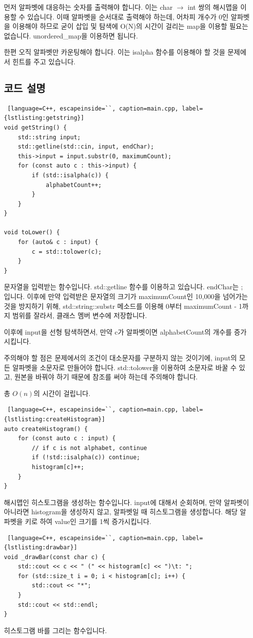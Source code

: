 \documentclass{article}
\begin{document}
먼저 알파벳에 대응하는 숫자를 출력해야 합니다. 이는 char $\rightarrow$ int 쌍의 해시맵을 이용할 수 있습니다. 이때 알파벳을 순서대로 출력해야 하는데, 어차피 개수가 0인 알파벳을 이용해야 하므로 굳이 삽입 및 탐색에 O(N)의 시간이 걸리는 map을 이용할 필요는 없습니다. unordered\_map을 이용하면 됩니다.

한편 오직 알파벳만 카운팅해야 합니다. 이는 isalpha 함수를 이용해야 할 것을 문제에서 힌트를 주고 있습니다.

\subsection{코드 설명}
\begin{lstlisting} [language=C++, escapeinside=``, caption=main.cpp, label={lstlisting:getstring}]
void getString() {
    std::string input;
    std::getline(std::cin, input, endChar);
    this->input = input.substr(0, maximumCount);
    for (const auto c : this->input) {
        if (std::isalpha(c)) {
            alphabetCount++;
        }
    }
}

void toLower() {
    for (auto& c : input) {
        c = std::tolower(c);
    }
}
\end{lstlisting}

문자열을 입력받는 함수입니다. std::getline 함수를 이용하고 있습니다. endChar는 ; 입니다. 이후에 만약 입력받은 문자열의 크기가 maximumCount인 10,000을 넘어가는 것을 방지하기 위해, std::string::substr 메소드를 이용해 0부터 maximumCount - 1까지 범위를 잘라서, 클래스 멤버 변수에 저장합니다.

이후에 input을 선형 탐색하면서, 만약 c가 알파벳이면 alphabetCount의 개수를 증가시킵니다.

주의해야 할 점은 문제에서의 조건이 대소문자를 구분하지 않는 것이기에, input의 모든 알파벳을 소문자로 만들어야 합니다. std::tolower을 이용하여 소문자로 바꿀 수 있고, 원본을 바꿔야 하기 때문에 참조를 써야 하는데 주의해야 합니다.

총 $O(n)$의 시간이 걸립니다.

\begin{lstlisting} [language=C++, escapeinside=``, caption=main.cpp, label={lstlisting:createHistogram}]
auto createHistogram() {
    for (const auto c : input) {
        // if c is not alphabet, continue
        if (!std::isalpha(c)) continue;
        histogram[c]++;
    }
}
\end{lstlisting}
해시맵인 히스토그램을 생성하는 함수입니다. input에 대해서 순회하며, 만약 알파벳이 아니라면 histogram을 생성하지 않고, 알파벳일 때 히스토그램을 생성합니다. 해당 알파벳을 키로 하여 value인 크기를 1씩 증가시킵니다.

\begin{lstlisting} [language=C++, escapeinside=``, caption=main.cpp, label={lstlisting:drawbar}]
void _drawBar(const char c) {
    std::cout << c << " (" << histogram[c] << ")\t: ";
    for (std::size_t i = 0; i < histogram[c]; i++) {
        std::cout << "*";
    }
    std::cout << std::endl;
}
\end{lstlisting}

히스토그램 바를 그리는 함수입니다.
\end{document}
